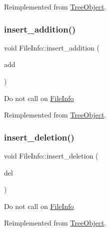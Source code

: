 Reimplemented from \mbox{\hyperlink{class_tree_object_af8cc57edba9f435b52ccf33cfbbb2fc6}{Tree\+Object}}.

\mbox{\label{class_file_info_a7f788f31521c535646eebfa9959bbb24}} 
\subsubsection{\texorpdfstring{insert\+\_\+addition()}{insert\_addition()}}
{\footnotesize\ttfamily void File\+Info\+::insert\+\_\+addition (\begin{DoxyParamCaption}\item[{\mbox{\hyperlink{class_tree_object}{Tree\+Object}} $\ast$}]{add }\end{DoxyParamCaption})\hspace{0.3cm}{\ttfamily [virtual]}}

Do not call on \mbox{\hyperlink{class_file_info}{File\+Info}} 

Reimplemented from \mbox{\hyperlink{class_tree_object_a41ce6080e0df5adcea4b0a76d35af885}{Tree\+Object}}.

\mbox{\label{class_file_info_a278136b1d68f55dc56a4be807076fc0d}} 
\subsubsection{\texorpdfstring{insert\+\_\+deletion()}{insert\_deletion()}}
{\footnotesize\ttfamily void File\+Info\+::insert\+\_\+deletion (\begin{DoxyParamCaption}\item[{\mbox{\hyperlink{class_tree_object}{Tree\+Object}} $\ast$}]{del }\end{DoxyParamCaption})\hspace{0.3cm}{\ttfamily [virtual]}}

Do not call on \mbox{\hyperlink{class_file_info}{File\+Info}} 

Reimplemented from \mbox{\hyperlink{class_tree_object_afcc4b3928d2b77ff080aa229a9706215}{Tree\+Object}}.

\mbox{\label{class_file_info_a96827c2e48fb1a15d468e9afd545383e}} 
